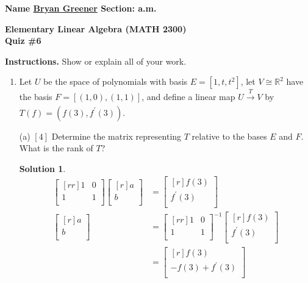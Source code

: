 \documentclass[12pt]{article}
\newcommand*\circled[1]{\tikz[baseline=(char.base)]{
            \node[shape=circle,draw,inner sep=0.8pt] (char) {#1};}}
\theoremstyle{definition}
\newtheorem*{solution}{Solution} %
\theoremstyle{plain}
\begin{document}
\begin{center}
\textbf{Name \underline{Bryan Greener\hspace{6cm}} Section: a.m. \circled{p.m.}}
\end{center}
\begin{center}
\textbf{Elementary Linear Algebra (MATH 2300)\\Quiz \#6}
\end{center}
\textbf{Instructions.} Show or explain all of your work.
\begin{enumerate}[wide, labelwidth=!, labelindent=0pt]
\item Let $U$ be the space of polynomials with basis $E=[1,t,t^2]$, let $V\cong\mathbb{R}^2$ have the basis $F=[(1,0),(1,1)]$, and define a linear map $U\xrightarrow[]{T}V$ by $T(f)=(f(3),f^\prime(3))$.
\item[(a)] $[4]$ Determine the matrix representing $T$ relative to the bases $E$ and $F$. What is the rank of $T$?\\
	\begin{solution}
	\begin{align*}
	\begin{bmatrix}[rr]1&0\\1&1\\\end{bmatrix}\begin{bmatrix}[r]a\\b\\\end{bmatrix}&=\begin{bmatrix}[r]f(3)\\f^\prime(3)\\\end{bmatrix}\\
	\begin{bmatrix}[r]a\\b\\\end{bmatrix} &= \begin{bmatrix}[rr]1&0\\1&1\\\end{bmatrix}^{-1}\begin{bmatrix}[r]f(3)\\f^\prime(3)\\\end{bmatrix}\\
	&= \begin{bmatrix}[r]f(3)\\-f(3)+f^\prime(3)\\\end{bmatrix}\\

\end{align*}
\end{solution}
\end{enumerate}
\end{document}
